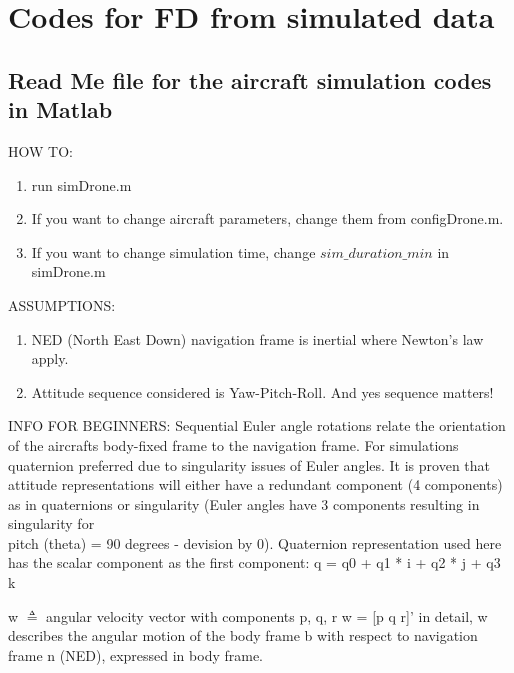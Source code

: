 \chapter{Codes for FD from simulated data}


\section{Read Me file for the aircraft simulation codes in Matlab}

HOW TO: 
\begin{enumerate}
  \item run simDrone.m 
  \item If you want to change aircraft parameters, change them from configDrone.m.
  \item If you want to change simulation time, change $sim\_duration\_min$ in simDrone.m
\end{enumerate}

ASSUMPTIONS: 

\begin{enumerate}
  \item NED (North East Down) navigation frame is inertial where Newton's law apply.
  \item Attitude sequence considered is Yaw-Pitch-Roll. And yes sequence matters!
\end{enumerate}


INFO FOR BEGINNERS: 
Sequential Euler angle rotations relate the orientation of the aircrafts body-fixed frame to the navigation frame. For simulations quaternion preferred due to singularity issues of Euler angles. It is proven that attitude representations will either have a redundant component (4 components) as in quaternions or singularity (Euler angles have 3 components resulting in singularity for \\
pitch (theta) = 90 degrees - devision by 0). Quaternion representation used here has the scalar component as the first component: q = q0 + q1 * i + q2 * j + q3 k

w $\triangleq$ angular velocity vector with components p, q, r w = [p q r]' in detail, w describes the angular motion of the body frame b with respect to navigation frame n (NED), expressed in body frame.


